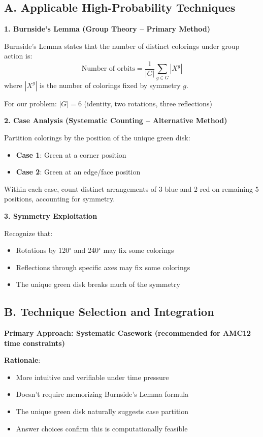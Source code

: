 \documentclass[11pt]{article}
\begin{document}
\begin{techniquesbox}
\subsection*{A. Applicable High-Probability Techniques}

\textbf{1. Burnside's Lemma (Group Theory -- Primary Method)}

Burnside's Lemma states that the number of distinct colorings under group action is:
\[
\text{Number of orbits} = \frac{1}{|G|} \sum_{g \in G} |X^g|
\]
where $|X^g|$ is the number of colorings fixed by symmetry $g$.

For our problem: $|G| = 6$ (identity, two rotations, three reflections)

\textbf{2. Case Analysis (Systematic Counting -- Alternative Method)}

Partition colorings by the position of the unique green disk:
\begin{itemize}
    \item \textbf{Case 1}: Green at a corner position
    \item \textbf{Case 2}: Green at an edge/face position
\end{itemize}

Within each case, count distinct arrangements of 3 blue and 2 red on remaining 5 positions, accounting for symmetry.

\textbf{3. Symmetry Exploitation}

Recognize that:
\begin{itemize}
    \item Rotations by 120$^\circ$ and 240$^\circ$ may fix some colorings
    \item Reflections through specific axes may fix some colorings
    \item The unique green disk breaks much of the symmetry
\end{itemize}

\subsection*{B. Technique Selection and Integration}

\textbf{Primary Approach: Systematic Casework (recommended for AMC12 time constraints)}

\textbf{Rationale}: 
\begin{itemize}
    \item More intuitive and verifiable under time pressure
    \item Doesn't require memorizing Burnside's Lemma formula
    \item The unique green disk naturally suggests case partition
    \item Answer choices confirm this is computationally feasible
\end{itemize}


\end{techniquesbox}
\end{document}
